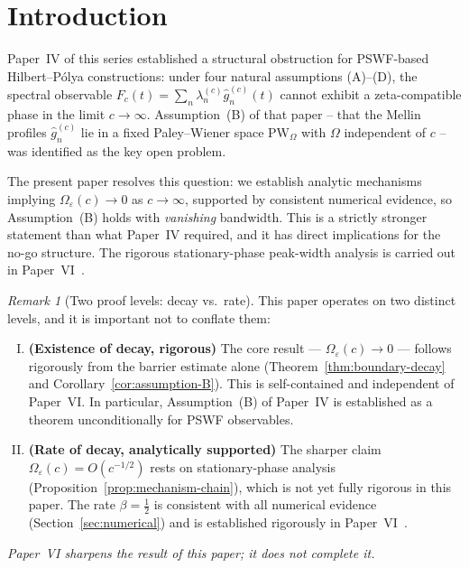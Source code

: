 \documentclass[12pt,a4paper]{amsart}
\theoremstyle{remark}
\newtheorem{remark}[theorem]{Remark}
\begin{document}
\section{Introduction}
\label{sec:intro}

Paper~IV of this series established a structural obstruction for
PSWF-based Hilbert--P\'olya constructions: under four natural
assumptions (A)--(D), the spectral observable
$F_c(t) = \sum_n \lambda_n^{(c)}\widehat{g}_n^{(c)}(t)$
cannot exhibit a zeta-compatible phase in the limit $c\to\infty$.
Assumption~(B) of that paper -- that the Mellin profiles
$\widehat{g}_n^{(c)}$ lie in a fixed Paley--Wiener space
$\mathrm{PW}_\Omega$ with $\Omega$ independent of $c$ -- was
identified as the key open problem.

The present paper resolves this question: we establish analytic mechanisms implying
$\Omega_\varepsilon(c) \to 0$ as $c\to\infty$,
supported by consistent numerical evidence,
so Assumption~(B) holds with \emph{vanishing} bandwidth.
This is a strictly stronger statement than what Paper~IV required,
and it has direct implications for the no-go structure.
The rigorous stationary-phase peak-width analysis is carried out in
Paper~VI~\cite{PaperVI}.

\begin{remark}[Two proof levels: decay vs.\ rate]
\label{rem:two-levels}
This paper operates on two distinct levels, and it is important
not to conflate them:
\begin{enumerate}[(I)]
\item \textbf{(Existence of decay, rigorous)}
The core result --- $\Omega_\varepsilon(c) \to 0$ --- follows
rigorously from the barrier estimate alone
(Theorem~\ref{thm:boundary-decay} and
Corollary~\ref{cor:assumption-B}).
This is self-contained and independent of Paper~VI.
In particular, Assumption~(B) of Paper~IV is established
as a theorem unconditionally for PSWF observables.
\item \textbf{(Rate of decay, analytically supported)}
The sharper claim $\Omega_\varepsilon(c) = O(c^{-1/2})$
rests on stationary-phase analysis
(Proposition~\ref{prop:mechanism-chain}),
which is not yet fully rigorous in this paper.
The rate $\beta = \tfrac{1}{2}$ is consistent with all
numerical evidence (Section~\ref{sec:numerical}) and
is established rigorously in Paper~VI~\cite{PaperVI}.
\end{enumerate}
\emph{Paper~VI sharpens the result of this paper;
it does not complete it.}
\end{remark}
\end{document}

